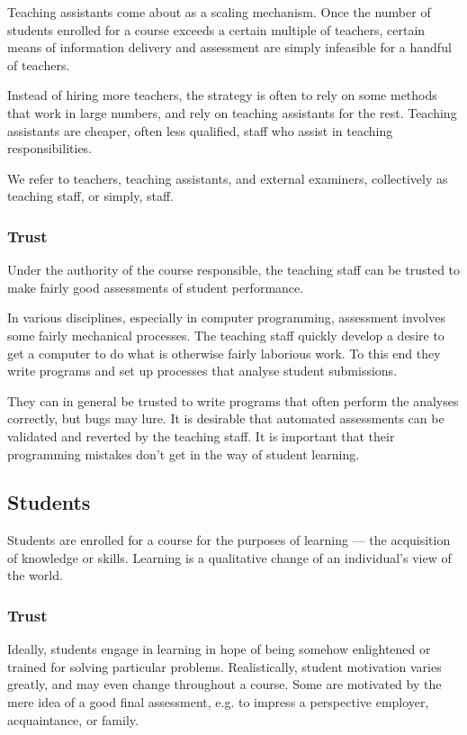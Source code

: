 Teaching assistants come about as a scaling mechanism. Once the number of
students enrolled for a course exceeds a certain multiple of teachers, certain
means of information delivery and assessment are simply infeasible for a
handful of teachers.

Instead of hiring more teachers, the strategy is often to rely on some methods
that work in large numbers, and rely on teaching assistants for the rest.
Teaching assistants are cheaper, often less qualified, staff who assist in
teaching responsibilities.

We refer to teachers, teaching assistants, and external examiners, collectively
as teaching staff, or simply, staff.

\subsubsection{Trust}

Under the authority of the course responsible, the teaching staff can be
trusted to make fairly good assessments of student performance.

In various disciplines, especially in computer programming, assessment involves
some fairly mechanical processes. The teaching staff quickly develop a desire
to get a computer to do what is otherwise fairly laborious work. To this end
they write programs and set up processes that analyse student submissions.

They can in general be trusted to write programs that often perform the
analyses correctly, but bugs may lure. It is desirable that automated
assessments can be validated and reverted by the teaching staff. It is
important that their programming mistakes don't get in the way of student
learning.

\subsection{Students}

Students are enrolled for a course for the purposes of learning --- the
acquisition of knowledge or skills. Learning is a qualitative change of an
individual's view of the world\cite{ramsden-1992}.

\subsubsection{Trust}

Ideally, students engage in learning in hope of being somehow enlightened or
trained for solving particular problems. Realistically, student motivation
varies greatly, and may even change throughout a course. Some are motivated by
the mere idea of a good final assessment, e.g. to impress a perspective
employer, acquaintance, or family.

